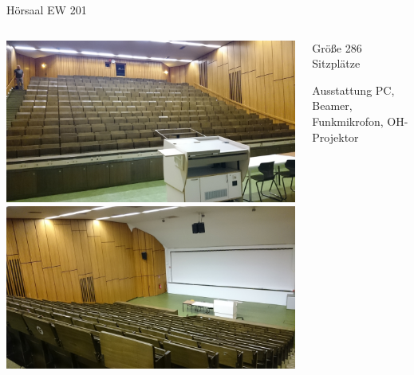 \documentclass[compress,]{beamer}
\begin{document}
\begin{frame}{Hörsaal EW 201}
\begin{columns}[onlytextwidth]
\begin{column}{0.5\textwidth}
\includegraphics[scale=0.04]{images/DSC_0712.JPG}\\
\includegraphics[scale=0.04]{images/DSC_0711.JPG}
\end{column}
\begin{column}{0.4\textwidth}
\begin{block}{Größe}
286 Sitzplätze
\end{block}
\vspace{1cm}
\begin{block}{Ausstattung}
PC, Beamer, Funkmikrofon, OH-Projektor
\end{block}
\end{column}
\end{columns}
\end{frame}
\end{document}
